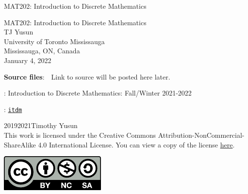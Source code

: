 \documentclass[oneside,10pt,]{book}
\newcommand{\titlepagefont}{\relax}
\newcommand{\mono}[1]{\texttt{#1}}
\numberwithin{equation}{section}
\begin{document}
\frontmatter
\thispagestyle{empty}
{\titlepagefont\centering
\vspace*{0.28\textheight}
{\Huge MAT202: Introduction to Discrete Mathematics}\\}
\clearpage
\thispagestyle{empty}
{\titlepagefont\centering
\vspace*{0.14\textheight}
{\Huge MAT202: Introduction to Discrete Mathematics}\\[3\baselineskip]
{\Large TJ Yusun}\\[0.5\baselineskip]
{\Large University of Toronto Mississauga\\
Mississauga, ON, Canada}\\[3\baselineskip]
{\Large January 4, 2022}\\}
\clearpage
\thispagestyle{empty}
\hypertarget{x:colophon:colophon}{}
\par\noindent
\textbf{Source files}:\ \ Link to source will be posted here later. 
\par{}
: Introduction to Discrete Mathematics: Fall\slash{}Winter 2021-2022\par\medskip
{}: \href{https:\slash{}\slash{}tjyusun.com\slash{}MAT202\slash{}}{\mono{itdm}}\par\medskip
\noindent\textcopyright{}2019\textendash{}2021\quad{}Timothy Yusun\\[0.5\baselineskip]
This work is licensed under the Creative Commons Attribution-NonCommercial-ShareAlike 4.0 International License. You can view a copy of the license \href{http://creativecommons.org/licenses/by-nc-sa/4.0/}{here}. \begin{image}{0.375}{0.25}{0.375}%
\includegraphics[width=\linewidth]{figs/by-nc-sa}
\end{image}%
\end{document}
